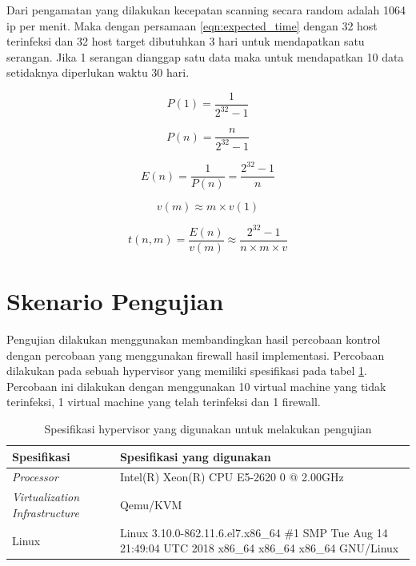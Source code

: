 Dari pengamatan yang dilakukan kecepatan scanning secara random adalah 1064 ip per menit. Maka dengan persamaan \ref{eqn:expected_time} dengan 32 host terinfeksi dan 32 host target dibutuhkan 3 hari untuk mendapatkan satu serangan. Jika 1 serangan dianggap satu data maka untuk mendapatkan 10 data setidaknya diperlukan waktu 30 hari.

\begin{equation}
\label{eqn:prob_one}
P(1) = \frac{1}{2^{32}-1}
\end{equation}

\begin{equation}
\label{eqn:prob_n}
P(n) = \frac {n}{2^{32}-1}
\end{equation}

\begin{equation}
\label{eqn:expectation_n}
E(n) = \frac{1}{P(n)} = \frac{2^{32}-1}{n}
\end{equation}

\begin{equation}
\label{eqn:velocity_m}
v(m) \approx m \times v(1)
\end{equation}

\begin{equation}
\label{eqn:expected_time}
t(n,m) = \frac{E(n)}{v(m)} \approx \frac{2^{32}-1}{n \times m \times v}
\end{equation}

\section{Skenario Pengujian}

Pengujian dilakukan menggunakan membandingkan hasil percobaan kontrol dengan percobaan yang menggunakan firewall hasil implementasi. Percobaan dilakukan pada sebuah hypervisor yang memiliki spesifikasi pada tabel \ref{table:hypervisor_specification}. Percobaan ini dilakukan dengan menggunakan 10 virtual machine yang tidak terinfeksi, 1 virtual machine yang telah terinfeksi dan 1 firewall.

\begin{table}[H]
	\caption{Spesifikasi hypervisor yang digunakan untuk melakukan pengujian}
	\label{table:hypervisor_specification}
	\begin{tabularx}{\textwidth}{|l|X|}
		\hline
		\textbf{Spesifikasi} & \textbf{Spesifikasi yang digunakan} \\ \hline
		\textit{Processor} & Intel(R) Xeon(R) CPU E5-2620 0 @ 2.00GHz \\ \hline 
		\textit{Virtualization Infrastructure} & Qemu/KVM \\ \hline
		Linux & Linux 3.10.0-862.11.6.el7.x86\_64 \#1 SMP Tue Aug 14 21:49:04 UTC 2018 x86\_64 x86\_64 x86\_64 GNU/Linux \\ \hline
	\end{tabularx}
\end{table}


